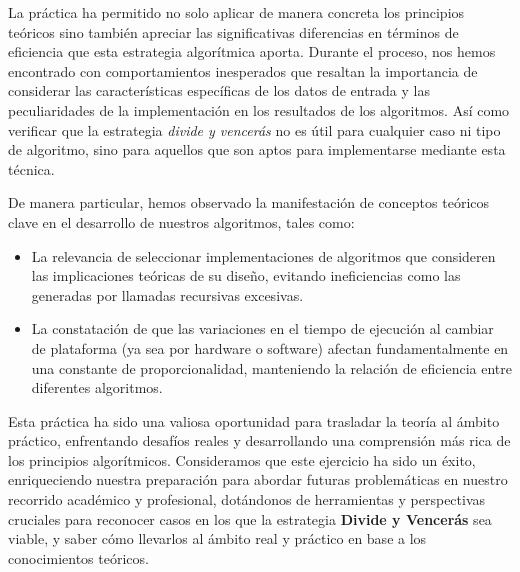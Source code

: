 \documentclass{article}
\begin{document}
La práctica ha permitido no solo aplicar de manera concreta los principios teóricos sino también apreciar las significativas diferencias en términos de eficiencia que esta estrategia algorítmica aporta. Durante el proceso, nos hemos encontrado con comportamientos inesperados que resaltan la importancia de considerar las características específicas de los datos de entrada y las peculiaridades de la implementación en los resultados de los algoritmos. Así como verificar que la estrategia \textit{divide y vencerás} no es útil para cualquier caso ni tipo de algoritmo, sino para aquellos que son aptos para implementarse mediante esta técnica.

De manera particular, hemos observado la manifestación de conceptos teóricos clave en el desarrollo de nuestros algoritmos, tales como:
\begin{itemize}
    \item La relevancia de seleccionar implementaciones de algoritmos que consideren las implicaciones teóricas de su diseño, evitando ineficiencias como las generadas por llamadas recursivas excesivas.
    \item La constatación de que las variaciones en el tiempo de ejecución al cambiar de plataforma (ya sea por hardware o software) afectan fundamentalmente en una constante de proporcionalidad, manteniendo la relación de eficiencia entre diferentes algoritmos.
\end{itemize}

Esta práctica ha sido una valiosa oportunidad para trasladar la teoría al ámbito práctico, enfrentando desafíos reales y desarrollando una comprensión más rica de los principios algorítmicos. Consideramos que este ejercicio ha sido un éxito, enriqueciendo nuestra preparación para abordar futuras problemáticas en nuestro recorrido académico y profesional, dotándonos de herramientas y perspectivas cruciales para reconocer casos en los que la estrategia \textbf{Divide y Vencerás} sea viable, y saber cómo llevarlos al ámbito real y práctico en base a los conocimientos teóricos.
\end{document}
